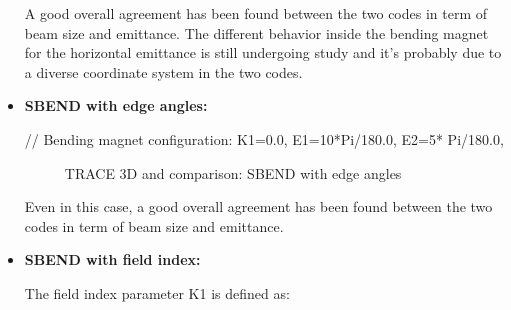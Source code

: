 \begin{itemize}
A good overall agreement has been found between the two codes in term of beam size and emittance. The different behavior inside the bending magnet for the horizontal emittance is still undergoing study and it's probably due to a diverse coordinate system in the two codes.

\item \textbf{SBEND with edge angles:}

\begin{example}
// Bending magnet configuration:
K1=0.0,
E1=10*Pi/180.0, E2=5* Pi/180.0,
\end{example}


\begin{figure}[htbp]
\begin{center}
    \hspace{1.8cm}
    \caption{TRACE 3D and \opal comparison: SBEND with edge angles}
    \label{fig:SBEND_Edges}
\end{center}
 \end{figure}

Even in this case, a good overall agreement has been found between the two codes in term of beam size and emittance.

\item \textbf{SBEND with field index:}

The field index parameter K1 is defined as:


\end{itemize}
